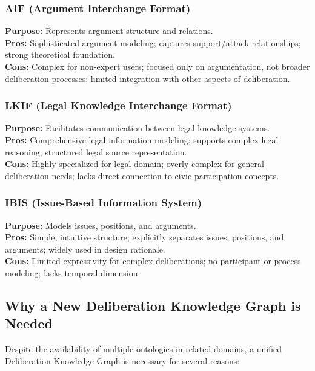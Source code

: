 \documentclass{article}
\begin{document}
\subsubsection{AIF (Argument Interchange Format)}
\textbf{Purpose:} Represents argument structure and relations.\\
\textbf{Pros:} Sophisticated argument modeling; captures support/attack relationships; strong theoretical foundation.\\
\textbf{Cons:} Complex for non-expert users; focused only on argumentation, not broader deliberation processes; limited integration with other aspects of deliberation.

\subsubsection{LKIF (Legal Knowledge Interchange Format)}
\textbf{Purpose:} Facilitates communication between legal knowledge systems.\\
\textbf{Pros:} Comprehensive legal information modeling; supports complex legal reasoning; structured legal source representation.\\
\textbf{Cons:} Highly specialized for legal domain; overly complex for general deliberation needs; lacks direct connection to civic participation concepts.

\subsubsection{IBIS (Issue-Based Information System)}
\textbf{Purpose:} Models issues, positions, and arguments.\\
\textbf{Pros:} Simple, intuitive structure; explicitly separates issues, positions, and arguments; widely used in design rationale.\\
\textbf{Cons:} Limited expressivity for complex deliberations; no participant or process modeling; lacks temporal dimension.

\subsection{Why a New Deliberation Knowledge Graph is Needed}

Despite the availability of multiple ontologies in related domains, a unified Deliberation Knowledge Graph is necessary for several reasons:
\end{document}
